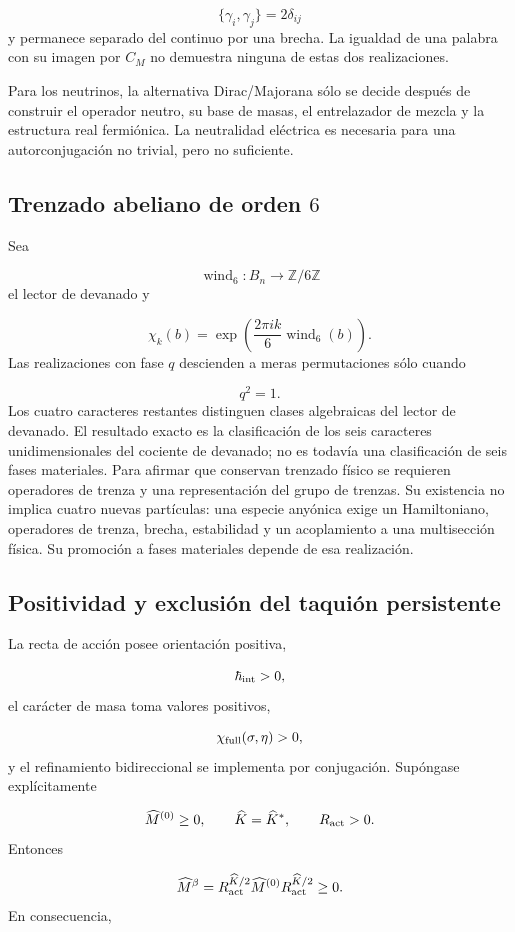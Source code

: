 \[
\{\gamma_i,\gamma_j\}=2\delta_{ij}
\]
y permanece separado del continuo por una brecha. La igualdad de una palabra con su imagen por \(C_M\) no demuestra ninguna de estas dos realizaciones.

Para los neutrinos, la alternativa Dirac/Majorana sólo se decide después de construir el operador neutro, su base de masas, el entrelazador de mezcla y la estructura real fermiónica. La neutralidad eléctrica es necesaria para una autorconjugación no trivial, pero no suficiente.

\subsection{Trenzado abeliano de orden \(6\)}
Sea

\[
\operatorname{wind}_6:B_n\longrightarrow\mathbb Z/6\mathbb Z
\]
el lector de devanado y

\[
\chi_k(b)=\exp\!\left(
\frac{2\pi i k}{6}\operatorname{wind}_6(b)\right).
\]
Las realizaciones con fase \(q\) descienden a meras permutaciones sólo cuando

\[
q^2=1.
\]
Los cuatro caracteres restantes distinguen clases algebraicas del lector de devanado. El resultado exacto es la clasificación de los seis caracteres unidimensionales del cociente de devanado; no es todavía una clasificación de seis fases materiales. Para afirmar que conservan trenzado físico se requieren operadores de trenza y una representación del grupo de trenzas. Su existencia no implica cuatro nuevas partículas: una especie anyónica exige un Hamiltoniano, operadores de trenza, brecha, estabilidad y un acoplamiento a una multisección física. Su promoción a fases materiales depende de esa realización.

\subsection{Positividad y exclusión del taquión persistente}
La recta de acción posee orientación positiva,

\[
\hbar_{\rm int}>0,
\]
el carácter de masa toma valores positivos,

\[
\chi_{\rm full}(\sigma,\eta)>0,
\]
y el refinamiento bidireccional se implementa por conjugación. Supóngase explícitamente

\[
\widehat M^{(0)}\ge0,
\qquad
\widehat K=\widehat K^*,
\qquad
R_{\rm act}>0.
\]
Entonces

\[
\widehat M^{\beta}
=R_{\rm act}^{\widehat K/2}
\widehat M^{(0)}
R_{\rm act}^{\widehat K/2}\ge0.
\]
En consecuencia,

